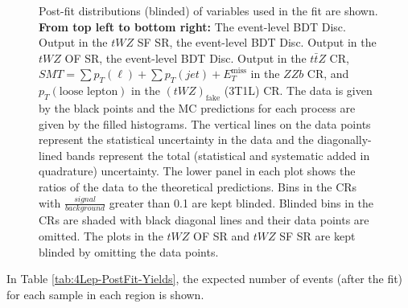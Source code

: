 \begin{figure}[htbp]
        \caption{Post-fit distributions (blinded) of variables used in the fit are shown. \textbf{From top left to bottom right:} The event-level BDT Disc. Output in the $tWZ$ SF SR, the event-level BDT Disc. Output in the $tWZ$ OF SR, the event-level BDT Disc. Output in the $t\bar{t}Z$ CR, $SMT = \sum p_{T} (\ell) + \sum p_{T} (jet) + E_{T}^{\text{miss}}$ in the $ZZb$ CR, and $p_{T}(\text{loose lepton})$ in the $(tWZ)_{\text{fake}}$ (3T1L) CR. The data is given by the black points and the MC predictions for each process are given by the filled histograms. The vertical lines on the data points represent the statistical uncertainty in the data and the diagonally-lined bands represent the total (statistical and systematic added in quadrature) uncertainty. The lower panel in each plot shows the ratios of the data to the theoretical predictions. Bins in the CRs with $\frac{signal}{background}$ greater than 0.1 are kept blinded. Blinded bins in the CRs are shaded with black diagonal lines and their data points are omitted. The plots in the $tWZ$ OF SR and $tWZ$ SF SR are kept blinded by omitting the data points. }
  \label{fig:4lep-postfitPlots}
\end{figure}In Table \ref{tab:4Lep-PostFit-Yields}, the expected number of events (after the fit) for each sample in each region is shown.
